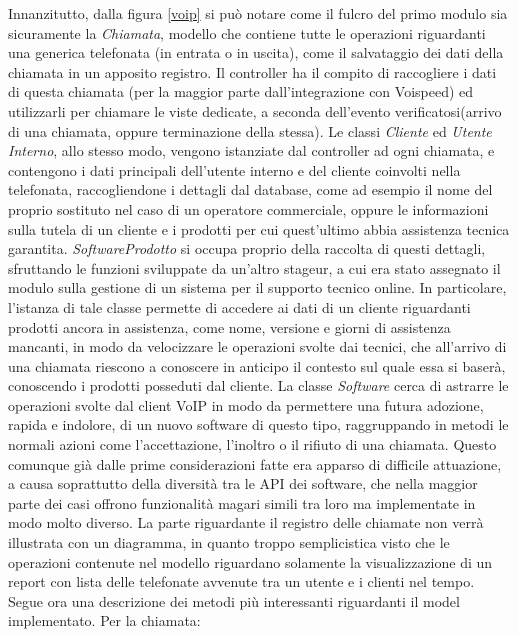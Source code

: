 \noindent
Innanzitutto, dalla figura \ref{voip} si pu\`o notare come il fulcro del primo modulo sia sicuramente la \textit{Chiamata}, modello che contiene tutte le operazioni riguardanti una generica telefonata (in entrata o in uscita), come il salvataggio dei dati della chiamata in un apposito registro. Il controller ha il compito di raccogliere i dati di questa chiamata (per la maggior parte dall'integrazione con Voispeed) ed utilizzarli per chiamare le viste dedicate, a seconda dell'evento verificatosi(arrivo di una chiamata, oppure terminazione della stessa). Le classi \textit{Cliente} ed \textit{Utente Interno}, allo stesso modo, vengono istanziate dal controller ad ogni chiamata, e contengono i dati principali dell'utente interno e del cliente coinvolti nella telefonata, raccogliendone i dettagli dal database, come ad esempio il nome del proprio sostituto nel caso di un operatore commerciale, oppure le informazioni sulla tutela di un cliente e i prodotti per cui quest'ultimo abbia assistenza tecnica garantita. \textit{SoftwareProdotto} si occupa proprio della raccolta di questi dettagli, sfruttando le funzioni sviluppate da un'altro stageur, a cui era stato assegnato il modulo sulla gestione di un sistema per il supporto tecnico online. In particolare, l'istanza di tale classe permette di accedere ai dati di un cliente riguardanti prodotti ancora in assistenza, come nome, versione e giorni di assistenza mancanti, in modo da velocizzare le operazioni svolte dai tecnici, che all'arrivo di una chiamata riescono a conoscere in anticipo il contesto sul quale essa si baser\`a, conoscendo i prodotti posseduti dal cliente. 
La classe \textit{Software} cerca di astrarre le operazioni svolte dal client VoIP in modo da permettere una futura adozione, rapida e  indolore, di un nuovo software di questo tipo, raggruppando in metodi le normali azioni come l'accettazione, l'inoltro o il rifiuto di una chiamata. Questo comunque gi\`a dalle prime considerazioni fatte era apparso di difficile attuazione, a causa soprattutto della diversit\`a tra le API dei software, che nella maggior parte dei casi offrono funzionalit\`a magari simili tra loro ma implementate in modo molto diverso. 
La parte riguardante il registro delle chiamate non verr\`a illustrata con un diagramma, in quanto troppo semplicistica visto che le operazioni contenute nel modello riguardano solamente la visualizzazione di un report con lista delle telefonate avvenute tra un utente e i clienti nel tempo.
Segue ora una descrizione dei metodi pi\`u interessanti riguardanti il model implementato.
Per la chiamata:
